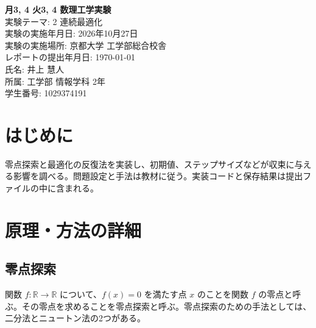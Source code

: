 \documentclass[a4j]{jarticle}
\begin{document}
\begin{titlepage}
    \centering
    \vspace*{2cm}  %
    
    {\Huge \textbf{月3, 4 火3, 4 数理工学実験}}\\[1.5cm]
    
    {\huge 実験テーマ: 2 連続最適化}\\[2cm]
    
    
    {\Large 
    実験の実施年月日: 2026年10月27日 \\[1cm]
    実験の実施場所: 京都大学 工学部総合校舎 \\[1cm]
    レポートの提出年月日: \today \\[1cm]
    氏名: 井上 慧人 \\[1cm]
    所属: 工学部 情報学科 2年\\[1cm]
    学生番号: 1029374191 \\[0.5cm]
    }
    
    \vfill %
    
\end{titlepage}

\newpage


\begin{abstract}
関数の零点や関数値が小さくなる点を求める方法をPythonで実装し、それぞれの結果を比較した。零点探索では、二分法とニュートン法のどちらでも、$-3$、$-1$、$2$に近い値が得られた。最適化では、最急降下法とニュートン法でほぼ同じ点に到達したが、更新回数には違いがあった。課題4ではそれぞれ31回と6回、課題5では791回と5回であり、今回はニュートン法の方が少ない更新で解を求められた。このことから、進む方向の決め方によって、解に到達するまでの更新回数が大きく変わることが分かった。また、課題6では制約のある最適化問題について調べ、課題6-4で求めた数値解が解析解と一致することを確認した。
\end{abstract}


\section{はじめに}
零点探索と最適化の反復法を実装し、初期値、ステップサイズなどが収束に与える影響を調べる。問題設定と手法は教材に従う。実装コードと保存結果は提出ファイルの中に含まれる。

\section{原理・方法の詳細}
\subsection{零点探索}
関数 $f\colon\mathbb{R}\to\mathbb{R}$ について、$f(x)=0$ を満たす点 $x$ のことを関数 $f$ の零点と呼ぶ。その零点を求めることを零点探索と呼ぶ。零点探索のための手法としては、二分法とニュートン法の2つがある。
\end{document}
